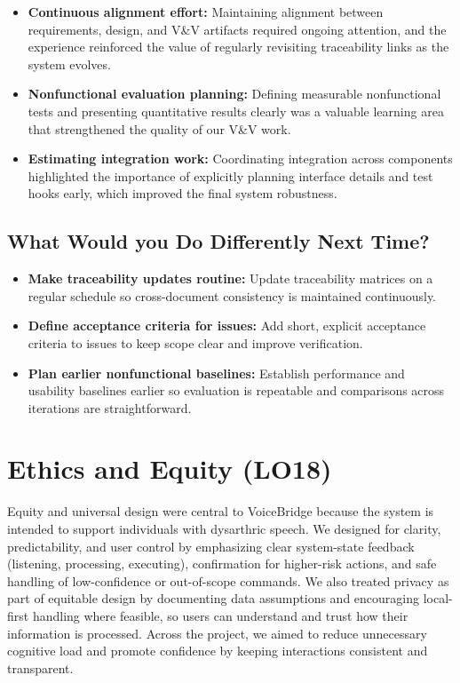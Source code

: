 \documentclass{article}
\begin{document}
\begin{itemize}
  \item \textbf{Continuous alignment effort:} Maintaining alignment between
  requirements, design, and V\&V artifacts required ongoing attention, and the
  experience reinforced the value of regularly revisiting traceability links as
  the system evolves.
  \item \textbf{Nonfunctional evaluation planning:} Defining measurable
  nonfunctional tests and presenting quantitative results clearly was a valuable
  learning area that strengthened the quality of our V\&V work.
  \item \textbf{Estimating integration work:} Coordinating integration across
  components highlighted the importance of explicitly planning interface details
  and test hooks early, which improved the final system robustness.
\end{itemize}

\subsection{What Would you Do Differently Next Time?}

\begin{itemize}
  \item \textbf{Make traceability updates routine:} Update traceability matrices
  on a regular schedule so cross-document consistency is maintained continuously.
  \item \textbf{Define acceptance criteria for issues:} Add short, explicit
  acceptance criteria to issues to keep scope clear and improve verification.
  \item \textbf{Plan earlier nonfunctional baselines:} Establish performance and
  usability baselines earlier so evaluation is repeatable and comparisons across
  iterations are straightforward.
\end{itemize}

\section{Ethics and Equity (LO18)}

Equity and universal design were central to VoiceBridge because the system is
intended to support individuals with dysarthric speech. We designed for clarity,
predictability, and user control by emphasizing clear system-state feedback
(listening, processing, executing), confirmation for higher-risk actions, and
safe handling of low-confidence or out-of-scope commands. We also treated privacy
as part of equitable design by documenting data assumptions and encouraging
local-first handling where feasible, so users can understand and trust how their
information is processed. Across the project, we aimed to reduce unnecessary
cognitive load and promote confidence by keeping interactions consistent and
transparent.
\end{document}
